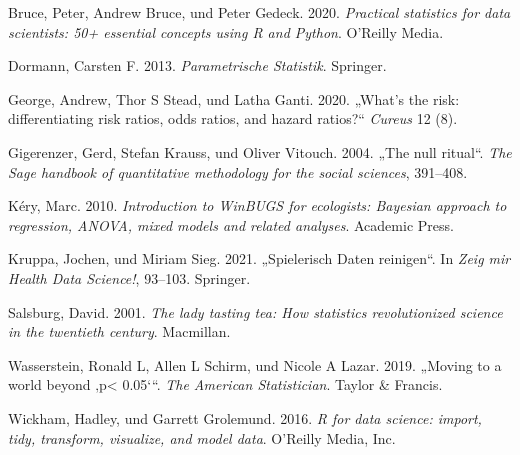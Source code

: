 \documentclass[
  letterpaper,
]{scrbook}
\newlength{\cslhangindent}
\newlength{\cslentryspacingunit} %
\newenvironment{CSLReferences}[2] %
 {%
  \setlength{\parindent}{0pt}
  \ifodd #1
  \let\oldpar\par
  \def\par{\hangindent=\cslhangindent\oldpar}
  \fi
  \setlength{\parskip}{#2\cslentryspacingunit}
 }%
 {}
\begin{document}
\hypertarget{refs}{}
\begin{CSLReferences}{1}{0}
\leavevmode{}%
Bruce, Peter, Andrew Bruce, und Peter Gedeck. 2020. \emph{Practical
statistics for data scientists: 50+ essential concepts using R and
Python}. O'Reilly Media.

\leavevmode{}%
Dormann, Carsten F. 2013. \emph{Parametrische Statistik}. Springer.

\leavevmode{}%
George, Andrew, Thor S Stead, und Latha Ganti. 2020. {„What's the risk:
differentiating risk ratios, odds ratios, and hazard ratios?``}
\emph{Cureus} 12 (8).

\leavevmode{}%
Gigerenzer, Gerd, Stefan Krauss, und Oliver Vitouch. 2004. {„The null
ritual``}. \emph{The Sage handbook of quantitative methodology for the
social sciences}, 391--408.

\leavevmode{}%
Kéry, Marc. 2010. \emph{Introduction to WinBUGS for ecologists: Bayesian
approach to regression, ANOVA, mixed models and related analyses}.
Academic Press.

\leavevmode{}%
Kruppa, Jochen, und Miriam Sieg. 2021. {„Spielerisch Daten reinigen``}.
In \emph{Zeig mir Health Data Science!}, 93--103. Springer.

\leavevmode{}%
Salsburg, David. 2001. \emph{The lady tasting tea: How statistics
revolutionized science in the twentieth century}. Macmillan.

\leavevmode{}%
Wasserstein, Ronald L, Allen L Schirm, und Nicole A Lazar. 2019.
{„Moving to a world beyond {‚p\textless{} 0.05`}``}. \emph{The American
Statistician}. Taylor \& Francis.

\leavevmode{}%
Wickham, Hadley, und Garrett Grolemund. 2016. \emph{R for data science:
import, tidy, transform, visualize, and model data}. O'Reilly Media,
Inc.

\end{CSLReferences}


\backmatter
\end{document}
